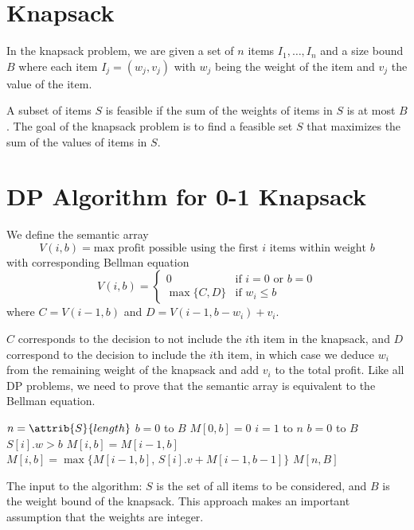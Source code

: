 \section{Knapsack}

In the knapsack problem, we are given a set of $n$ items $I_1,\ldots,I_n$ and a size bound $B$ where each item $I_j=(w_j,v_j)$ with $w_j$ being the weight of the item and $v_j$ the value of the item.

A subset of items $S$ is feasible if the sum of the weights of items in $S$ is at most $B$. The goal of the knapsack problem is to find a feasible set $S$ that maximizes the sum of the values of items in $S$.

\section{DP Algorithm for 0-1 Knapsack}

We define the semantic array
$$
V(i,b) = \text{max profit possible using the first $i$ items within weight $b$}
$$
with corresponding Bellman equation
$$
V(i,b) = \begin{cases}
    0 & \text{if $i=0$ or $b=0$} \\
    \max\{C,D\} & \text{if $w_i \leq b$}
\end{cases}
$$
where $C = V(i-1,b)$ and $D = V(i-1,b-w_i) + v_i$.

$C$ corresponds to the decision to not include the $i$th item in the knapsack, and $D$ correspond to the decision to include the $i$th item, in which case we deduce $w_i$ from the remaining weight of the knapsack and add $v_i$ to the total profit. Like all DP problems, we need to prove that the semantic array is equivalent to the Bellman equation.

\begin{codebox}
    \li $n = \attrib{S}{length}$ 
    \li \For $b=0$ to $B$ \Do
        \li $M[0,b] = 0$
    \End
    \li \For $i=1$ to $n$ \Do
        \li \For $b = 0$ to $B$ \Do
            \li \If $S[i].w > b$ \Then
                \li $M[i,b] = M[i-1,b]$
            \li \Else
                \li $M[i,b] = \max\{M[i-1,b],\, S[i].v + M[i-1,b-1]\}$
            \End
        \End
    \End
    \li $M[n,B]$ 
\end{codebox}

The input to the algorithm: $S$ is the set of all items to be considered, and $B$ is the weight bound of the knapsack. This approach makes an important assumption that the weights are integer.


